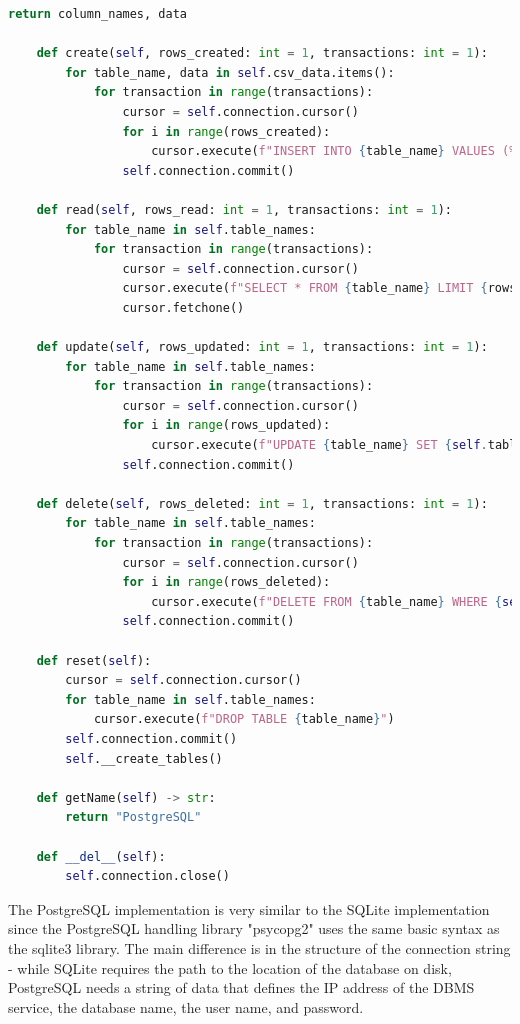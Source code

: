 \begin{lstlisting}[language=Python, caption=PostgresDatabaseTesting]
        return column_names, data

    def create(self, rows_created: int = 1, transactions: int = 1):
        for table_name, data in self.csv_data.items():
            for transaction in range(transactions):
                cursor = self.connection.cursor()
                for i in range(rows_created):
                    cursor.execute(f"INSERT INTO {table_name} VALUES (%s, %s, %s, %s)", data[i+transaction*rows_created])
                self.connection.commit()

    def read(self, rows_read: int = 1, transactions: int = 1):
        for table_name in self.table_names:
            for transaction in range(transactions):
                cursor = self.connection.cursor()
                cursor.execute(f"SELECT * FROM {table_name} LIMIT {rows_read}")
                cursor.fetchone()

    def update(self, rows_updated: int = 1, transactions: int = 1):
        for table_name in self.table_names:
            for transaction in range(transactions):
                cursor = self.connection.cursor()
                for i in range(rows_updated):
                    cursor.execute(f"UPDATE {table_name} SET {self.table_column_names[table_name][2]} = 0 WHERE {self.table_column_names[table_name][0]} = %s", (self.csv_data[table_name][i+transaction*rows_updated][0],))
                self.connection.commit()

    def delete(self, rows_deleted: int = 1, transactions: int = 1):
        for table_name in self.table_names:
            for transaction in range(transactions):
                cursor = self.connection.cursor()
                for i in range(rows_deleted):
                    cursor.execute(f"DELETE FROM {table_name} WHERE {self.table_column_names[table_name][0]} = %s", (self.csv_data[table_name][i+transaction*rows_deleted][0],))
                self.connection.commit()

    def reset(self):
        cursor = self.connection.cursor()
        for table_name in self.table_names:
            cursor.execute(f"DROP TABLE {table_name}")
        self.connection.commit()
        self.__create_tables()

    def getName(self) -> str:
        return "PostgreSQL"

    def __del__(self):
        self.connection.close()
\end{lstlisting}
\par The PostgreSQL implementation is very similar to the SQLite implementation since the PostgreSQL handling library "psycopg2" uses the same basic syntax as the sqlite3 library. The main difference is in the structure of the connection string - while SQLite requires the path to the location of the database on disk, PostgreSQL needs a string of data that defines the IP address of the DBMS service, the database name, the user name, and password. 
